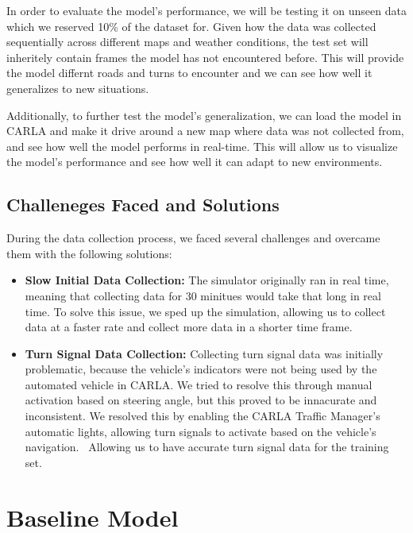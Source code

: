 \documentclass{article} %
\begin{document}
In order to evaluate the model's performance, we will be testing it on unseen data which we reserved 10\% of the dataset for. Given how 
the data was collected sequentially across different maps and weather conditions, the test set will inheritely contain frames the model has not encountered before.
This will provide the model differnt roads and turns to encounter and we can see how well it generalizes to new situations.

Additionally, to further test the model's generalization, we can load the model in CARLA and make it drive around a new map where data was not collected from, and see how well the model performs in 
real-time. This will allow us to visualize the model's performance and see how well it can adapt to new environments.

\subsection{Challeneges Faced and Solutions}

During the data collection process, we faced several challenges and overcame them with the following solutions:

\begin{itemize}
  \item \textbf{Slow Initial Data Collection:} The simulator originally ran in real time, meaning that collecting data for 30 minitues would take that long in real time. 
  To solve this issue, we sped up the simulation, allowing us to collect data at a faster rate and collect more data in a shorter time frame.

  \item \textbf{Turn Signal Data Collection:} Collecting turn signal data was initially problematic, 
  because the vehicle's indicators were not being used by the automated vehicle in CARLA. 
  We tried to resolve this through manual activation based on steering angle, but this proved to be innacurate and inconsistent. 
  We resolved this by enabling the CARLA Traffic Manager’s automatic lights, allowing turn signals to activate based on the vehicle's navigation. \
  Allowing us to have accurate turn signal data for the training set. 

\end{itemize}
 
\section{Baseline Model}
\end{document}
